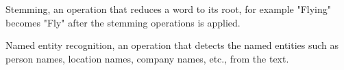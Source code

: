 \documentclass[12pt, a4paper]{article}
\begin{document}
Stemming, an operation that reduces a word to its root, for example "Flying" becomes "Fly" after the stemming operations is applied.


Named entity recognition, an operation that detects the named entities such as person names, location names, company names, etc., from the text.
\hfill\break





\end{document}
